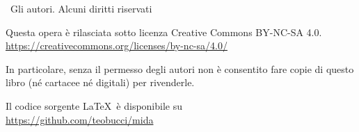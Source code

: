\textcopyright \ Gli autori. Alcuni diritti riservati

Questa opera è rilasciata sotto licenza Creative Commons BY-NC-SA 4.0.\\
\url{https://creativecommons.org/licenses/by-nc-sa/4.0/}

In particolare, senza il permesso degli autori non è consentito fare copie di questo libro (né cartacee né digitali) per rivenderle.

Il codice sorgente \LaTeX \ è disponibile su \\
\url{https://github.com/teobucci/mida}